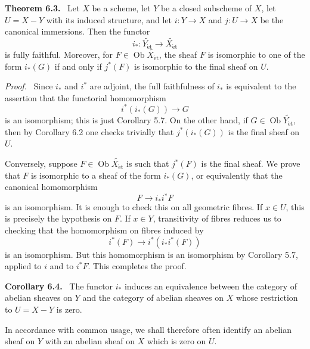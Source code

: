 \documentclass[11pt]{article}
\newcommand{\Ob}{\operatorname{Ob}}
\newcommand{\et}{\mathrm{\acute{e}t}}
\newenvironment{statement}[1]{\par\medskip\noindent\textbf{#1.}\ }{\par\medskip}
\newenvironment{prooftext}{\par\noindent\emph{Proof.}\ }{\par\medskip}
\begin{document}
\begin{statement}{Theorem 6.3}
Let \(X\) be a scheme, let \(Y\) be a closed subscheme of \(X\), let \(U=X-Y\) with its induced structure, and let \(i:Y\to X\) and \(j:U\to X\) be the canonical immersions. Then the functor
\[
i_*:\widetilde{Y_{\et}}\longrightarrow \widetilde{X_{\et}}
\]
is fully faithful. Moreover, for \(F\in\Ob\widetilde{X_{\et}}\), the sheaf \(F\) is isomorphic to one of the form \(i_*(G)\) if and only if \(j^*(F)\) is isomorphic to the final sheaf on \(U\).
\end{statement}

\begin{prooftext}
Since \(i_*\) and \(i^*\) are adjoint, the full faithfulness of \(i_*\) is equivalent to the assertion that the functorial homomorphism
\[
i^*(i_*(G))\longrightarrow G
\]
is an isomorphism; this is just Corollary 5.7. On the other hand, if \(G\in\Ob\widetilde{Y_{\et}}\), then by Corollary 6.2 one checks trivially that \(j^*(i_*(G))\) is the final sheaf on \(U\).

Conversely, suppose \(F\in\Ob\widetilde{X_{\et}}\) is such that \(j^*(F)\) is the final sheaf. We prove that \(F\) is isomorphic to a sheaf of the form \(i_*(G)\), or equivalently that the canonical homomorphism
\[
F\longrightarrow i_*i^*F
\]
is an isomorphism. It is enough to check this on all geometric fibres. If \(x\in U\), this is precisely the hypothesis on \(F\). If \(x\in Y\), transitivity of fibres reduces us to checking that the homomorphism on fibres induced by
\[
i^*(F)\longrightarrow i^*(i_*i^*(F))
\]
is an isomorphism. But this homomorphism is an isomorphism by Corollary 5.7, applied to \(i\) and to \(i^*F\). This completes the proof.
\end{prooftext}

\begin{statement}{Corollary 6.4}
The functor \(i_*\) induces an equivalence between the category of abelian sheaves on \(Y\) and the category of abelian sheaves on \(X\) whose restriction to \(U=X-Y\) is zero.
\end{statement}

In accordance with common usage, we shall therefore often identify an abelian sheaf on \(Y\) with an abelian sheaf on \(X\) which is zero on \(U\).
\end{document}
